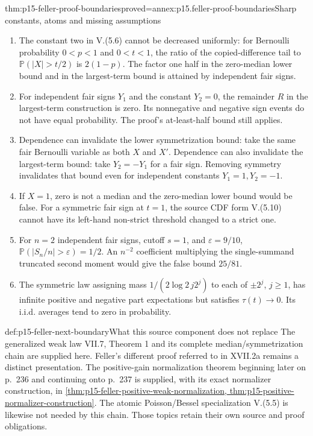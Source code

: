 \begin{hbtheorem}{thm:p15-feller-proof-boundaries}{proved=annex:p15.feller-proof-boundaries}{Sharp constants, atoms and missing assumptions}
\begin{enumerate}
\item The constant two in V.(5.6) cannot be decreased uniformly:
for Bernoulli probability \(0<p<1\) and \(0<t<1\), the ratio of the
copied-difference tail to \(\mathbb P(|X|>t/2)\) is \(2(1-p)\).
The factor one half in the zero-median lower bound and in the
largest-term bound is attained by independent fair signs.
\item For independent fair signs \(Y_1\) and the constant \(Y_2=0\),
the remainder \(R\) in the largest-term construction is zero.
Its nonnegative and negative sign events do not have equal probability.
The proof's at-least-half bound still applies.
\item Dependence can invalidate the lower symmetrization bound:
take the same fair Bernoulli variable as both \(X\) and \(X'\).
Dependence can also invalidate the largest-term bound: take
\(Y_2=-Y_1\) for a fair sign. Removing symmetry invalidates that
bound even for independent constants \(Y_1=1,Y_2=-1\).
\item If \(X=1\), zero is not a median and the zero-median lower
bound would be false. For a symmetric fair sign at \(t=1\),
the source CDF form V.(5.10) cannot have its left-hand
non-strict threshold changed to a strict one.
\item For \(n=2\) independent fair signs, cutoff \(s=1\), and
\(\varepsilon=9/10\),
\(\mathbb P(|S_n/n|>\varepsilon)=1/2\).
An \(n^{-2}\) coefficient multiplying the single-summand truncated
second moment would give the false bound \(25/81\).
\item The symmetric law assigning mass
\(1/(2\log2\,j2^j)\) to each of \(\pm2^j\), \(j\geq1\),
has infinite positive and negative part expectations but satisfies
\(\tau(t)\to0\). Its i.i.d. averages tend to zero in probability.
\end{enumerate}
\end{hbtheorem}

\begin{proofboundary}{def:p15-feller-next-boundary}{What this source component does not replace}
The generalized weak law VII.7, Theorem 1 and its complete
median/symmetrization chain are supplied here. Feller's different
proof referred to in XVII.2a remains a distinct presentation.
The positive-gain normalization theorem beginning later on p.~236
and continuing onto p.~237 is supplied, with its exact normalizer
construction, in \cref{thm:p15-feller-positive-weak-normalization,
thm:p15-positive-normalizer-construction}. The atomic
Poisson/Bessel specialization V.(5.5) is likewise not needed by this
chain. Those topics retain their own source and proof obligations.
\end{proofboundary}
